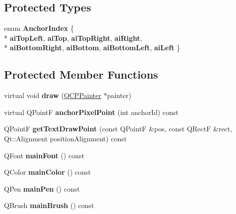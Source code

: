 \subsection*{Protected Types}
\begin{DoxyCompactItemize}
\item 
enum {\bfseries Anchor\-Index} \{ \\*
{\bfseries ai\-Top\-Left}, 
{\bfseries ai\-Top}, 
{\bfseries ai\-Top\-Right}, 
{\bfseries ai\-Right}, 
\\*
{\bfseries ai\-Bottom\-Right}, 
{\bfseries ai\-Bottom}, 
{\bfseries ai\-Bottom\-Left}, 
{\bfseries ai\-Left}
 \}
\end{DoxyCompactItemize}
\subsection*{Protected Member Functions}
\begin{DoxyCompactItemize}
\item 
\hypertarget{classQCPItemText_a8793adb271ab79b4cf391dc55e9987f1}{virtual void {\bfseries draw} (\hyperlink{classQCPPainter}{Q\-C\-P\-Painter} $\ast$painter)}\label{classQCPItemText_a8793adb271ab79b4cf391dc55e9987f1}

\item 
\hypertarget{classQCPItemText_ad248f988534a9d07bc7c220a2457142a}{virtual Q\-Point\-F {\bfseries anchor\-Pixel\-Point} (int anchor\-Id) const }\label{classQCPItemText_ad248f988534a9d07bc7c220a2457142a}

\item 
\hypertarget{classQCPItemText_aa6e478b1ce198eace89157c4cacc3ddc}{Q\-Point\-F {\bfseries get\-Text\-Draw\-Point} (const Q\-Point\-F \&pos, const Q\-Rect\-F \&rect, Qt\-::\-Alignment position\-Alignment) const }\label{classQCPItemText_aa6e478b1ce198eace89157c4cacc3ddc}

\item 
\hypertarget{classQCPItemText_a23d391bd6471c45e73f45add67ede902}{Q\-Font {\bfseries main\-Font} () const }\label{classQCPItemText_a23d391bd6471c45e73f45add67ede902}

\item 
\hypertarget{classQCPItemText_ad7bf17e4945cc86bbf9a36331da059a0}{Q\-Color {\bfseries main\-Color} () const }\label{classQCPItemText_ad7bf17e4945cc86bbf9a36331da059a0}

\item 
\hypertarget{classQCPItemText_a9ade32d362b22853659201c738269e2a}{Q\-Pen {\bfseries main\-Pen} () const }\label{classQCPItemText_a9ade32d362b22853659201c738269e2a}

\item 
\hypertarget{classQCPItemText_a10d6585a030633aa79d5ebc5a437f183}{Q\-Brush {\bfseries main\-Brush} () const }\label{classQCPItemText_a10d6585a030633aa79d5ebc5a437f183}

\end{DoxyCompactItemize}
